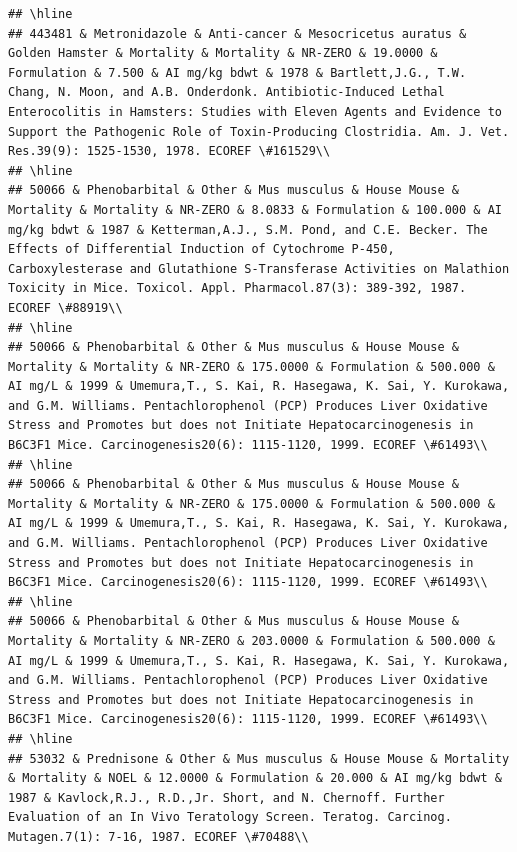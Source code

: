 \documentclass[12pt,]{article}
\begin{document}
\begin{verbatim}
## \hline
## 443481 & Metronidazole & Anti-cancer & Mesocricetus auratus & Golden Hamster & Mortality & Mortality & NR-ZERO & 19.0000 & Formulation & 7.500 & AI mg/kg bdwt & 1978 & Bartlett,J.G., T.W. Chang, N. Moon, and A.B. Onderdonk. Antibiotic-Induced Lethal Enterocolitis in Hamsters: Studies with Eleven Agents and Evidence to Support the Pathogenic Role of Toxin-Producing Clostridia. Am. J. Vet. Res.39(9): 1525-1530, 1978. ECOREF \#161529\\
## \hline
## 50066 & Phenobarbital & Other & Mus musculus & House Mouse & Mortality & Mortality & NR-ZERO & 8.0833 & Formulation & 100.000 & AI mg/kg bdwt & 1987 & Ketterman,A.J., S.M. Pond, and C.E. Becker. The Effects of Differential Induction of Cytochrome P-450, Carboxylesterase and Glutathione S-Transferase Activities on Malathion Toxicity in Mice. Toxicol. Appl. Pharmacol.87(3): 389-392, 1987. ECOREF \#88919\\
## \hline
## 50066 & Phenobarbital & Other & Mus musculus & House Mouse & Mortality & Mortality & NR-ZERO & 175.0000 & Formulation & 500.000 & AI mg/L & 1999 & Umemura,T., S. Kai, R. Hasegawa, K. Sai, Y. Kurokawa, and G.M. Williams. Pentachlorophenol (PCP) Produces Liver Oxidative Stress and Promotes but does not Initiate Hepatocarcinogenesis in B6C3F1 Mice. Carcinogenesis20(6): 1115-1120, 1999. ECOREF \#61493\\
## \hline
## 50066 & Phenobarbital & Other & Mus musculus & House Mouse & Mortality & Mortality & NR-ZERO & 175.0000 & Formulation & 500.000 & AI mg/L & 1999 & Umemura,T., S. Kai, R. Hasegawa, K. Sai, Y. Kurokawa, and G.M. Williams. Pentachlorophenol (PCP) Produces Liver Oxidative Stress and Promotes but does not Initiate Hepatocarcinogenesis in B6C3F1 Mice. Carcinogenesis20(6): 1115-1120, 1999. ECOREF \#61493\\
## \hline
## 50066 & Phenobarbital & Other & Mus musculus & House Mouse & Mortality & Mortality & NR-ZERO & 203.0000 & Formulation & 500.000 & AI mg/L & 1999 & Umemura,T., S. Kai, R. Hasegawa, K. Sai, Y. Kurokawa, and G.M. Williams. Pentachlorophenol (PCP) Produces Liver Oxidative Stress and Promotes but does not Initiate Hepatocarcinogenesis in B6C3F1 Mice. Carcinogenesis20(6): 1115-1120, 1999. ECOREF \#61493\\
## \hline
## 53032 & Prednisone & Other & Mus musculus & House Mouse & Mortality & Mortality & NOEL & 12.0000 & Formulation & 20.000 & AI mg/kg bdwt & 1987 & Kavlock,R.J., R.D.,Jr. Short, and N. Chernoff. Further Evaluation of an In Vivo Teratology Screen. Teratog. Carcinog. Mutagen.7(1): 7-16, 1987. ECOREF \#70488\\

\end{verbatim}
\end{document}

